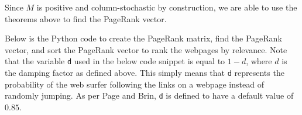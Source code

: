 \documentclass[11pt]{article}
\theoremstyle{definition}
\begin{document}
Since $M$ is positive and column-stochastic by construction, we are able to use the theorems above to find the PageRank vector.

Below is the Python code to create the PageRank matrix, find the PageRank vector, and sort the PageRank vector to rank the webpages by relevance.
Note that the variable \texttt{d} used in the below code snippet is equal to $1-d$, where $d$ is the damping factor as defined above.
This simply means that \texttt{d} represents the probability of the web surfer following the links on a webpage instead of randomly jumping.
As per Page and Brin, \texttt{d} is defined to have a default value of $0.85$.



\end{document}

